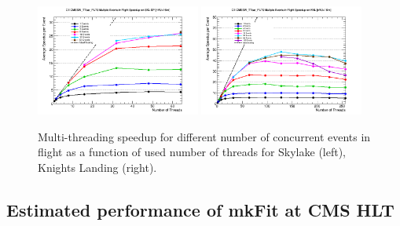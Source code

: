 \documentclass{webofc}
\def\mkfit{mkFit\xspace}
\def\twop{0.48\textwidth}
\def\threep{0.32\textwidth}
\def\postfigskip{\vskip-4mm}
\begin{document}
\begin{figure}[htb]
  \centering
  \includegraphics[width=\twop]{figs/comp/SKL-SP_CMSSW_TTbar_PU70_CE_MEIF_speedup.png}
  \hfill
  \includegraphics[width=\twop]{figs/comp/KNL_CMSSW_TTbar_PU70_CE_MEIF_speedup.png}
  \postfigskip

  \caption{Multi-threading speedup for different number of concurrent events
    in flight as a function of used number of threads for Skylake (left),
    Knights Landing (right).}
  \label{fig:meif-speedup}
\end{figure}


\subsection{Estimated performance of \mkfit at CMS HLT}
\end{document}

